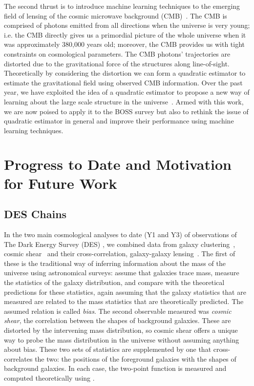 \documentclass[12pt]{article}
\begin{document}
\begin{small}
The second thrust is to introduce machine learning techniques to the emerging field of lensing of the cosmic microwave background (CMB)~\cite{dodelson_2017}. The CMB is comprised of photons emitted from all directions when the universe is very young; i.e. the CMB directly gives us a primordial picture of the whole universe when it was approximately 380,000 years old; moreover, the CMB provides us with tight constraints on cosmological parameters. The CMB photons' trajectories are distorted due to the gravitational force of the structures along line-of-sight. Theoretically by considering the distortion we can form a quadratic estimator to estimate the gravitational field using observed CMB information. Over the past year, we have exploited the idea of a quadratic estimator to propose a new way of learning about the large scale structure in the universe~\cite{Li:2020uug,Li:2020luq}. Armed with this work, we are now poised to apply it to the BOSS survey but also to rethink the issue of quadratic estimator in general and improve their performance using machine learning techniques.

\section{Progress to Date and Motivation for Future Work}




\subsection{DES Chains}

In the two main cosmological analyses to date (Y1 and Y3) of observations of The Dark Energy Survey (DES) \cite{Abbott:2017wau}, we combined data from galaxy clustering~\cite{Elvin-Poole:2017xsf}, cosmic shear~\cite{Troxel:2017xyo} and their cross-correlation, galaxy-galaxy lensing~\cite{Prat:2017goa}. The first of these is the traditional way of inferring information about the mass of the universe using astronomical surveys: assume that galaxies trace mass, measure the statistics of the galaxy distribution, and compare with the theoretical predictions for these statistics, again assuming that the galaxy statistics that are measured are related to the mass statistics that are theoretically predicted. The assumed relation is called \emph{bias}. The second observable measured was \emph{cosmic shear}, the correlation between the shapes of background galaxies. These are distorted by the intervening mass distribution, so cosmic shear offers a unique way to probe the mass distribution in the universe without assuming anything about bias. These two sets of statistics are supplemented by one that cross-correlates the two: the positions of the foreground galaxies with the shapes of background galaxies. In each case, the two-point function is measured and computed theoretically using \cosmosis. 


\end{small}
\end{document}
